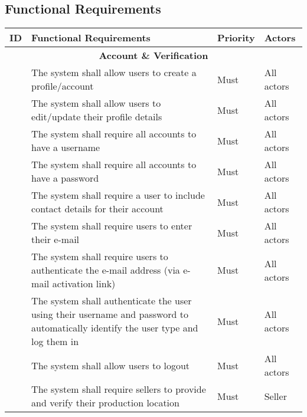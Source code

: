 \subsection{Functional Requirements}
\label{sub:functional_req}

\newcommand\rownumber{\stepcounter{magicrownumbers}\arabic{magicrownumbers}}
{
\footnotesize
\begin{longtable}{|p{0.5cm}|p{10cm}p{1.3cm}p{1.7cm}|}

\rowcolor[HTML]{000000}
{\color[HTML]{FFFFFF} \textbf{ID}} & {\color[HTML]{FFFFFF} \textbf{Functional Requirements}}  & {\color[HTML]{FFFFFF} \textbf{Priority}} & {\color[HTML]{FFFFFF}  \textbf{Actors}  } \\ \hline \endhead
\multicolumn{4}{|c|}{\textbf{Account \& Verification}} \\ \hline
\rownumber & The system shall allow users to create a profile/account &Must & \multicolumn{1}{l|}{All actors} \\ \hline
\rownumber & The system shall allow users to edit/update their profile details& Must & \multicolumn{1}{l|}{All actors} \\ \hline
\rownumber & The system shall require all accounts to have a username &Must & \multicolumn{1}{l|}{All actors} \\ \hline
\rownumber & The system shall require all accounts to have a password &Must & \multicolumn{1}{l|}{All actors} \\ \hline
\rownumber & The system shall require a user to include contact details for their account &Must& \multicolumn{1}{l|}{All actors} \\ \hline
\rownumber & The system shall require users to enter their e-mail &Must  & \multicolumn{1}{l|}{All actors} \\ \hline
\rownumber & The system shall require users to authenticate the e-mail address (via e-mail activation link) &Must  & \multicolumn{1}{l|}{All actors} \\ \hline
\rownumber & The system shall authenticate the user using their username and password to automatically identify the user type and log them in &Must  & \multicolumn{1}{l|}{All actors} \\ \hline
\rownumber & The system shall allow users to logout& Must  & \multicolumn{1}{l|}{All actors} \\ \hline
\rownumber & The system shall require sellers to provide and verify their production location & Must  & \multicolumn{1}{l|}{Seller} \\ \hline

\end{longtable}}
